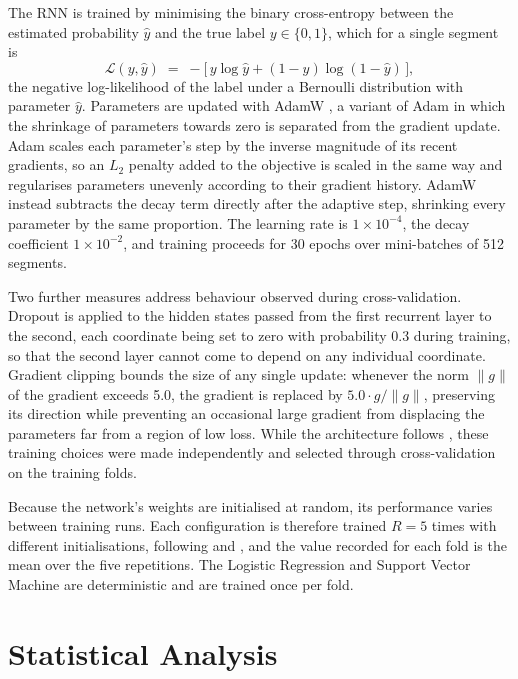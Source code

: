 \documentclass{mproj}
\begin{document}
The RNN is trained by minimising the binary cross-entropy between the estimated probability $\hat{y}$ and the true label $y \in \{0, 1\}$, which for a single segment is
%
\begin{equation}
\mathcal{L}(y, \hat{y}) \;=\; -\bigl[\, y \log \hat{y} + (1 - y) \log (1 - \hat{y}) \,\bigr],
\end{equation}
%
the negative log-likelihood of the label under a Bernoulli distribution with parameter $\hat{y}$. Parameters are updated with AdamW \cite{loshchilov2019}, a variant of Adam \cite{kingma2015} in which the shrinkage of parameters towards zero is separated from the gradient update. Adam scales each parameter's step by the inverse magnitude of its recent gradients, so an $L_2$ penalty added to the objective is scaled in the same way and regularises parameters unevenly according to their gradient history. AdamW instead subtracts the decay term directly after the adaptive step, shrinking every parameter by the same proportion. The learning rate is $1 \times 10^{-4}$, the decay coefficient $1 \times 10^{-2}$, and training proceeds for 30 epochs over mini-batches of 512 segments.

Two further measures address behaviour observed during cross-validation. Dropout is applied to the hidden states passed from the first recurrent layer to the second, each coordinate being set to zero with probability 0.3 during training, so that the second layer cannot come to depend on any individual coordinate. Gradient clipping bounds the size of any single update: whenever the norm $\|g\|$ of the gradient exceeds 5.0, the gradient is replaced by $5.0 \cdot g / \|g\|$, preserving its direction while preventing an occasional large gradient from displacing the parameters far from a region of low loss. While the architecture follows \cite{alsofyani2021}, these training choices were made independently and selected through cross-validation on the training folds.

Because the network's weights are initialised at random, its performance varies between training runs. Each configuration is therefore trained $R = 5$ times with different initialisations, following \cite{alsofyani2021} and \cite{alsarrani2025}, and the value recorded for each fold is the mean over the five repetitions. The Logistic Regression and Support Vector Machine are deterministic and are trained once per fold.

\section{Statistical Analysis}\label{sec:stats}
\end{document}
